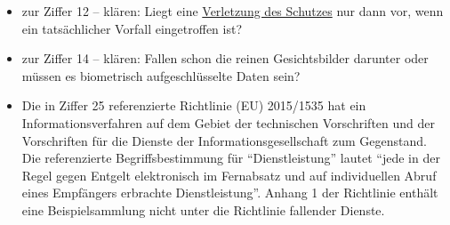 
\begin{itemize}

  \item zur Ziffer 12 -- klären: Liegt eine \hyperref[itm:04-12]{Verletzung des Schutzes} nur dann vor, wenn ein
   tatsächlicher Vorfall eingetroffen ist?

  \item zur Ziffer 14 -- klären: Fallen schon die reinen Gesichtsbilder darunter oder müssen es biometrisch
   aufgeschlüsselte Daten sein?

  \item Die in Ziffer 25 referenzierte Richtlinie (EU) 2015/1535 \cite{ril-iv-tv} hat ein Informationsverfahren auf dem
   Gebiet der technischen Vorschriften und der Vorschriften für die Dienste der Informationsgesellschaft zum
   Gegenstand. Die referenzierte Begriffsbestimmung für "`Dienstleistung"' lautet "`jede in der Regel gegen Entgelt
   elektronisch im Fernabsatz und auf individuellen Abruf eines Empfängers erbrachte Dienstleistung"'. 
   Anhang 1 der Richtlinie enthält eine Beispielsammlung nicht unter die Richtlinie fallender Dienste.

\end{itemize}
